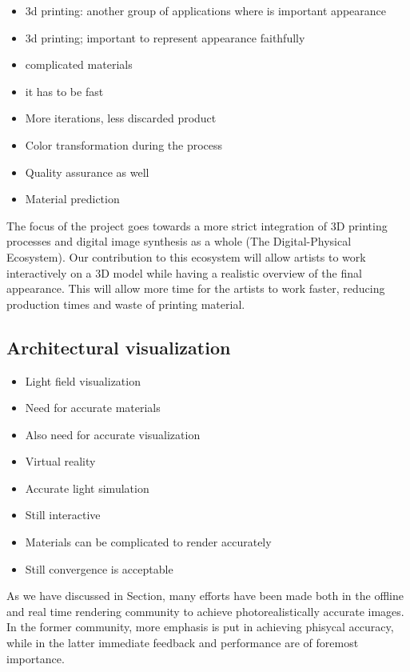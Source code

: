 \begin{itemize}
\item 3d printing: another group of applications where is important appearance
\item 3d printing; important to represent appearance faithfully
\item complicated materials
\item it has to be fast
\item More iterations, less discarded product
\item Color transformation during the process
\item Quality assurance as well
\item Material prediction 
\end{itemize}

The focus of the project goes towards a more strict integration of 3D printing processes and
digital image synthesis as a whole (The Digital-Physical Ecosystem). Our contribution to this
ecosystem will allow artists to work interactively on a 3D model while having a realistic overview
of the final appearance. This will allow more time for the artists to work faster, reducing
production times and waste of printing material.


\subsection{Architectural visualization}

\begin{itemize}
\item Light field visualization
\item Need for accurate materials
\item Also need for accurate visualization
\item Virtual reality
\item Accurate light simulation
\item Still interactive
\item Materials can be complicated to render accurately
\item Still convergence is acceptable
\end{itemize}

As we have discussed in Section, many efforts have been made both in the offline and real time rendering community to achieve photorealistically accurate images. In the former community, more emphasis is put in achieving phisycal accuracy, while in the latter immediate feedback and performance are of foremost importance.

